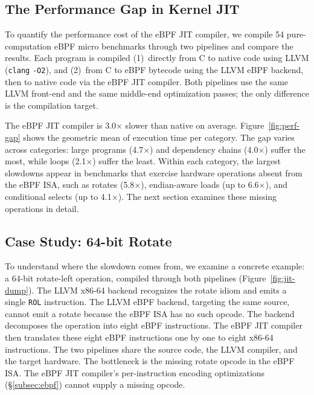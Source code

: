 \subsection{The Performance Gap in Kernel JIT}
\label{subsec:gap}

To quantify the performance cost of the eBPF JIT compiler, we compile 54 pure-computation eBPF micro benchmarks through two pipelines and compare the results. Each program is compiled (1)~directly from C to native code using LLVM (\texttt{clang} \texttt{-O2}), and (2)~from C to eBPF bytecode using the LLVM eBPF backend, then to native code via the eBPF JIT compiler. Both pipelines use the same LLVM front-end and the same middle-end optimization passes; the only difference is the compilation target.

The eBPF JIT compiler is 3.0$\times$ slower than native on average. Figure~\ref{fig:perf-gap} shows the geometric mean of execution time per category. The gap varies across categories: large programs (4.7$\times$) and dependency chains (4.0$\times$) suffer the most, while loops (2.1$\times$) suffer the least. Within each category, the largest slowdowns appear in benchmarks that exercise hardware operations absent from the eBPF ISA, such as rotates (5.8$\times$), endian-aware loads (up to 6.6$\times$), and conditional selects (up to 4.1$\times$). The next section examines these missing operations in detail.



\subsection{Case Study: 64-bit Rotate}
\label{subsec:rootcause}

To understand where the slowdown comes from, we examine a concrete example: a 64-bit rotate-left operation, compiled through both pipelines (Figure~\ref{fig:jit-dump}). The LLVM x86-64 backend recognizes the rotate idiom and emits a single \texttt{ROL} instruction. The LLVM eBPF backend, targeting the same source, cannot emit a rotate because the eBPF ISA has no such opcode. The backend decomposes the operation into eight eBPF instructions. The eBPF JIT compiler then translates these eight eBPF instructions one by one to eight x86-64 instructions. The two pipelines share the source code, the LLVM compiler, and the target hardware. The bottleneck is the missing rotate opcode in the eBPF ISA. The eBPF JIT compiler's per-instruction encoding optimizations (\S\ref{subsec:ebpf}) cannot supply a missing opcode.

